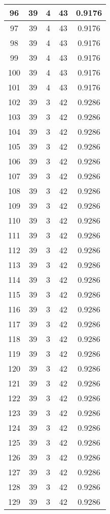 \documentclass[letterpaper, 12pt]{article}
\begin{document}
\begin{longtable}{|c|c|c|c|c|}
\hline
96 & 39 & 4 & 43 & 0.9176 \\
\hline
97 & 39 & 4 & 43 & 0.9176 \\
\hline
98 & 39 & 4 & 43 & 0.9176 \\
\hline
99 & 39 & 4 & 43 & 0.9176 \\
\hline
100 & 39 & 4 & 43 & 0.9176 \\
\hline
101 & 39 & 4 & 43 & 0.9176 \\
\hline
102 & 39 & 3 & 42 & 0.9286 \\
\hline
103 & 39 & 3 & 42 & 0.9286 \\
\hline
104 & 39 & 3 & 42 & 0.9286 \\
\hline
105 & 39 & 3 & 42 & 0.9286 \\
\hline
106 & 39 & 3 & 42 & 0.9286 \\
\hline
107 & 39 & 3 & 42 & 0.9286 \\
\hline
108 & 39 & 3 & 42 & 0.9286 \\
\hline
109 & 39 & 3 & 42 & 0.9286 \\
\hline
110 & 39 & 3 & 42 & 0.9286 \\
\hline
111 & 39 & 3 & 42 & 0.9286 \\
\hline
112 & 39 & 3 & 42 & 0.9286 \\
\hline
113 & 39 & 3 & 42 & 0.9286 \\
\hline
114 & 39 & 3 & 42 & 0.9286 \\
\hline
115 & 39 & 3 & 42 & 0.9286 \\
\hline
116 & 39 & 3 & 42 & 0.9286 \\
\hline
117 & 39 & 3 & 42 & 0.9286 \\
\hline
118 & 39 & 3 & 42 & 0.9286 \\
\hline
119 & 39 & 3 & 42 & 0.9286 \\
\hline
120 & 39 & 3 & 42 & 0.9286 \\
\hline
121 & 39 & 3 & 42 & 0.9286 \\
\hline
122 & 39 & 3 & 42 & 0.9286 \\
\hline
123 & 39 & 3 & 42 & 0.9286 \\
\hline
124 & 39 & 3 & 42 & 0.9286 \\
\hline
125 & 39 & 3 & 42 & 0.9286 \\
\hline
126 & 39 & 3 & 42 & 0.9286 \\
\hline
127 & 39 & 3 & 42 & 0.9286 \\
\hline
128 & 39 & 3 & 42 & 0.9286 \\
\hline
129 & 39 & 3 & 42 & 0.9286 \\

\end{longtable}
\end{document}
